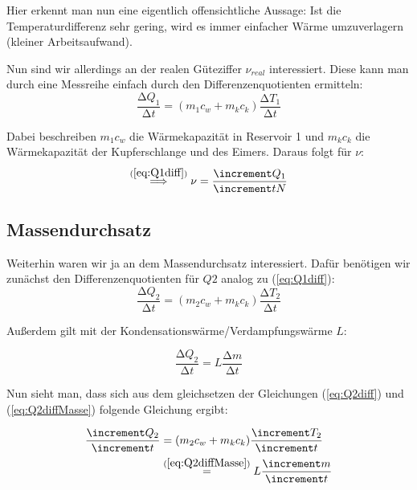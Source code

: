 Hier erkennt man nun eine eigentlich offensichtliche Aussage:
Ist die Temperaturdifferenz sehr gering, wird es immer einfacher Wärme umzuverlagern (kleiner Arbeitsaufwand).

Nun sind wir allerdings an der realen Güteziffer $\nu_{real}$ interessiert.
Diese kann man durch eine Messreihe einfach durch den Differenzenquotienten ermitteln:
\begin{equation} \label{eq:Q1diff}
    \frac{\increment Q_{1}}{\increment t} = (m_{1} c_{w} + m_{k} c_{k}) \frac{\increment T_{1}}{\increment t}
\end{equation}

Dabei beschreiben $m_{1} c_{w}$ die Wärmekapazität in Reservoir 1 und $m_{k} c_{k}$ die Wärmekapazität der Kupferschlange und des Eimers.
Daraus folgt für $\nu$:
\begin{equation} \label{eq:emp_nu}
    \stackrel{(\ref{eq:Q1diff})}{\implies} \nu = \frac{\increment Q_{1}}{\increment t N}
\end{equation}

\subsection{Massendurchsatz}

Weiterhin waren wir ja an dem Massendurchsatz interessiert. Dafür benötigen wir zunächst den Differenzenquotienten für $Q{2}$ analog zu (\ref{eq:Q1diff}):
\begin{equation} \label{eq:Q2diff}
    \frac{\increment Q_{2}}{\increment t} = (m_{2} c_{w} + m_{k} c_{k}) \frac{\increment T_{2}}{\increment t}
\end{equation}

Außerdem gilt mit der Kondensationswärme/Verdampfungswärme $L$:

\begin{equation} \label{eq:Q2diffMasse}
    \frac{\increment Q_{2}}{\increment t} = L \frac{\increment m}{\increment t}
\end{equation}

Nun sieht man, dass sich aus dem gleichsetzen der Gleichungen (\ref{eq:Q2diff}) und (\ref{eq:Q2diffMasse}) folgende Gleichung ergibt:

\begin{align}
    \begin{split}
        \frac{\increment Q_{2}}{\increment t} & = (m_{2} c_{w} + m_{k} c_{k}) \frac{\increment T_{2}}{\increment t} \\
            & \stackrel{(\ref{eq:Q2diffMasse})}{=} L \frac{\increment m}{\increment t}
    \end{split}
\end{align}

